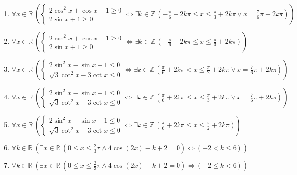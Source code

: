 \documentclass[11pt,a4paper]{article}
\begin{document}
\begin{enumerate}
\item $\displaystyle \forall x \in \mathbb{R}\ \left( \begin{cases} 2\cos^{2} x + \cos x - 1 \ge 0 \\ 2\sin x + 1 \ge 0 \end{cases} \iff \exists k \in \mathbb{Z}\ \left( -\frac{\pi}{6} + 2k\pi \le x \le \frac{\pi}{3} + 2k\pi \lor x = \frac{7}{6}\pi + 2k\pi \right) \right)$
\item $\displaystyle \forall x \in \mathbb{R}\ \left( \begin{cases} 2\cos^{2} x + \cos x - 1 \ge 0 \\ 2\sin x + 1 \ge 0 \end{cases} \iff \exists k \in \mathbb{Z}\ \left( -\frac{\pi}{6} + 2k\pi \le x \le \frac{\pi}{3} + 2k\pi \right) \right)$
\item $\displaystyle \forall x \in \mathbb{R}\ \left( \begin{cases} 2\sin^{2} x - \sin x - 1 \le 0 \\ \sqrt{3}\cot^{2} x - 3\cot x \le 0 \end{cases} \iff \exists k \in \mathbb{Z}\ \left( \frac{\pi}{6} + 2k\pi < x \le \frac{\pi}{2} + 2k\pi \lor x = \frac{7}{6}\pi + 2k\pi \right) \right)$
\item $\displaystyle \forall x \in \mathbb{R}\ \left( \begin{cases} 2\sin^{2} x - \sin x - 1 \le 0 \\ \sqrt{3}\cot^{2} x - 3\cot x \le 0 \end{cases} \iff \exists k \in \mathbb{Z}\ \left( \frac{\pi}{6} + 2k\pi \le x \le \frac{\pi}{3} + 2k\pi \lor x = \frac{7}{6}\pi + 2k\pi \right) \right)$
\item $\displaystyle \forall x \in \mathbb{R}\ \left( \begin{cases} 2\sin^{2} x - \sin x - 1 \le 0 \\ \sqrt{3}\cot^{2} x - 3\cot x \le 0 \end{cases} \iff \exists k \in \mathbb{Z}\ \left( \frac{\pi}{6} + 2k\pi \le x \le \frac{\pi}{2} + 2k\pi \right) \right)$
\item $\displaystyle \forall k \in \mathbb{R}\ \left( \exists x \in \mathbb{R}\ \left( 0 \le x \le \frac{2}{3}\pi \land 4\cos\left(2x\right) - k + 2 = 0 \right) \iff \left( -2 < k \le 6 \right) \right)$
\item $\displaystyle \forall k \in \mathbb{R}\ \left( \exists x \in \mathbb{R}\ \left( 0 \le x \le \frac{2}{3}\pi \land 4\cos\left(2x\right) - k + 2 = 0 \right) \iff \left( -2 \le k < 6 \right) \right)$
\end{enumerate}
\end{document}
